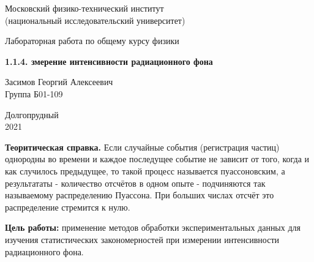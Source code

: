 \documentclass[a4paper, 10pt]{article}%
\begin{document}
\begin{titlepage}

    \newpage
    \begin{center}
        \normalsize Московский физико-технический институт \\(национальный исследовательский университет)
    \end{center}

    \vspace{6em}

    \begin{center}
        \Large Лабораторная работа по общему курсу физики\\
    \end{center}

    \vspace{1em}

    \begin{center}
        \Large \textbf{1.1.4. змерение интенсивности радиационного фона}
    \end{center}

    \vspace{2em}

    \begin{center}
        \large Засимов Георгий Алексеевич \\
        Группа Б01-109
    \end{center}

    \vspace{\fill}

    \begin{center}
    Долгопрудный \\2021
    \end{center}
    
\end{titlepage}


\maketitle
\newpage
\textbf{Теоритическая справка.} Если случайные события (регистрация частиц) однородны во времени и каждое последущее событие не зависит от того, когда и как случилось предыдущее, то такой процесс называется пуассоновским, а результататы - количество отсчётов в одном опыте - подчиняются так называемому распределению Пуассона. При больших числах отсчёт это распределение стремится к нулю. 

\textbf{Цель работы:} применение методов обработки экспериментальных данных для изучения статистических закономерностей при измерении интенсивности радиационного фона.
\end{document}
